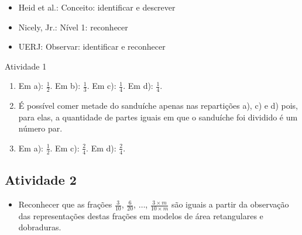 \begin{multicols}{2}
 \vspace{.1cm}

\begin{itemize} %
    \item       Heid et al.: Conceito: identificar e descrever
    \item       Nicely, Jr.: Nível 1: reconhecer
    \item       UERJ: Observar: identificar e reconhecer
\end{itemize} %


\begin{resposta*}{Atividade 1}
\begin{enumerate} [\quad a)] %
    \item       Em a):       $\frac{1}{2}$. Em b):       $\frac{1}{3}$. Em c):
    $\frac{1}{4}$. Em d):       $\frac{1}{4}$.
    \item       É possível comer metade do sanduíche apenas nas repartições a),
c) e d) pois, para elas, a quantidade de partes iguais em que o sanduíche foi
dividido é um número par.
    \item       Em a):       $\frac{1}{2}$. Em c):       $\frac{2}{4}$. Em d):
    $\frac{2}{4}$.
\end{enumerate} %

\end{resposta*}





\subsection{Atividade 2}

\begin{itemize} %
    \item       Reconhecer que as frações       $\frac{3}{10}$,
$\frac{6}{20}$,       $\ldots$,       $\frac{3 \times m}{10 \times m}$       são
iguais a partir da observação das representações destas frações em modelos de
área retangulares e dobraduras.
\end{itemize} %




\end{multicols}
